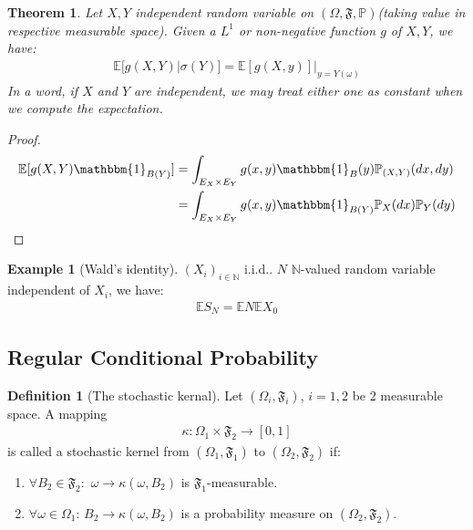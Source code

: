 \documentclass[a4paper,11pt]{book}
\newtheorem{theorem}{Theorem}[section]
\theoremstyle{definition}
\newtheorem{definition}{Definition}[section]
\newtheorem*{example}{Example}
\theoremstyle{remark}
\begin{document}
\begin{theorem}
Let $X, Y$ independent random variable on $(\Omega, \mathfrak{F}, \mathbb{P})$(taking value in respective measurable space). Given a $L^1$ or non-negative function $g$ of $X, Y$, we have:
\begin{align*}
	\mathbb{E}[g(X,Y)|\sigma(Y)] = \mathbb{E}[g(X, y)]|_{y = Y(\omega)}
\end{align*}
In a word, if $X$ and $Y$ are independent, we may treat either one as constant when we compute the expectation.
\end{theorem}
\begin{proof}
	\begin{align*}
		\mathbb{E}[g(X, Y)\mathbbm{1}_{B(Y)}] &= \int_{E_X \times E_Y} g(x, y) \mathbbm{1}_{B}(y)\mathbb{P}_{(X, Y)}(dx, dy)\\
		&= \int_{E_X \times E_Y} g(x, y)\mathbbm{1}_{B(Y)}\mathbb{P}_X(dx)\mathbb{P}_Y(dy)
	\end{align*}
\end{proof}

\begin{example}[Wald's identity]
$(X_i)_{i \in \mathbb{N}}$ i.i.d.. $N$ $\mathbb{N}$-valued random variable independent of $X_i$, we have:
\begin{align*}
	\mathbb{E}S_N = \mathbb{E}N \mathbb{E}X_0
\end{align*}
\end{example}



\subsection{Regular Conditional Probability}
\begin{definition}[The stochastic kernal]
	Let $(\Omega_i, \mathfrak{F}_i)$, $i = 1, 2$ be 2 measurable space. A mapping
	\begin{align*}
		\kappa: \Omega_1 \times \mathfrak{F}_2 \rightarrow [0, 1] 
	\end{align*}
	is called a stochastic kernel from $(\Omega_1, \mathfrak{F}_1)$ to $(\Omega_2, \mathfrak{F}_2)$ if:
	\begin{enumerate}
		\item $\forall B_2 \in \mathfrak{F}_2: $ $\omega \rightarrow \kappa(\omega, B_2)$ is $\mathfrak{F}_1$-measurable.
		\item $\forall \omega \in \Omega_1$: $B_2 \rightarrow \kappa(\omega, B_2)$ is a probability measure on $(\Omega_2, \mathfrak{F}_2)$.
	\end{enumerate}
\end{definition}
\end{document}
